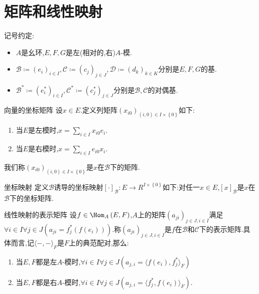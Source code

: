 \section{矩阵和线性映射}

记号约定:

\begin{itemize}
	\item $A$是幺环,$E,F,G$是左(相对的,右)$A$-模.
	\item $\mathcal{B}\coloneq\left(e_{i}\right)_{i\in I},\mathcal{C}\coloneq\left(c_{j}\right)_{j\in J},\mathcal{D}\coloneq\left(d_{k}\right)_{k\in K}$分别是$E,F,G$的基.
	\item $\mathcal{B}^{\ast}\coloneq\left(e_{i}^{\ast}\right)_{i\in I},\mathcal{C}^{\ast}\coloneq\left(c_{j}^{\ast}\right)_{j\in J}$分别是$\mathcal{B},\mathcal{C}$的对偶基.
\end{itemize}

\begin{definition}{向量的坐标矩阵}{}
	设$x\in E$.定义列矩阵$\left(x_{i0}\right)_{\left(i,0\right)\in I\times\left\{0\right\}}$如下:
	\begin{enumerate}
		\item 当$E$是左模时,$x=\sum\limits_{i\in I}x_{i0}e_{i}$.
		\item 当$E$是右模时,$x=\sum\limits_{i\in I}e_{i0}x_{i}$.
	\end{enumerate}
	我们称$\left(x_{i0}\right)_{\left(i,0\right)\in I\times\left\{0\right\}}$是$x$在$\mathcal{B}$下的矩阵.
\end{definition}

\begin{definition}{坐标映射}{}
	定义$\mathcal{B}$诱导的坐标映射$\left[\cdot\right]_{\mathcal{B}}:E\to R^{I\times\left\{0\right\}}$如下:对任一$x\in E$,$\left[x\right]_{\mathcal{B}}$是$x$在$\mathcal{B}$下的坐标矩阵.
\end{definition}

\begin{definition}{线性映射的表示矩阵}{}
	设$f\in\Hom_{A}\left(E,F\right)$,$A$上的矩阵$\left(a_{ji}\right)_{j\in J,i\in I}$满足$\forall i\in I\forall j\in J\left(a_{ji}=f_{j}^{\ast}\left(f\left(e_{i}\right)\right)\right)$.称$\left(a_{ji}\right)_{j\in J,i\in I}$是$f$在$\mathcal{B}$和$\mathcal{C}$下的表示矩阵.具体而言,记$\langle-,-\rangle_{F}$是$F$上的典范配对,那么:
	\begin{enumerate}
		\item 当$E,F$都是左$A$-模时,$\forall i\in I\forall j\in J\left(a_{j,i}=\langle f\left(e_{i}\right),f_{j}^{\ast}\rangle_{F}\right)$
		\item 当$E,F$都是右$A$-模时,$\forall i\in I\forall j\in J\left(a_{j,i}=\langle f_{j}^{\ast},f\left(e_{i}\right)\rangle_{F}\right)$.
	\end{enumerate}
\end{definition}

